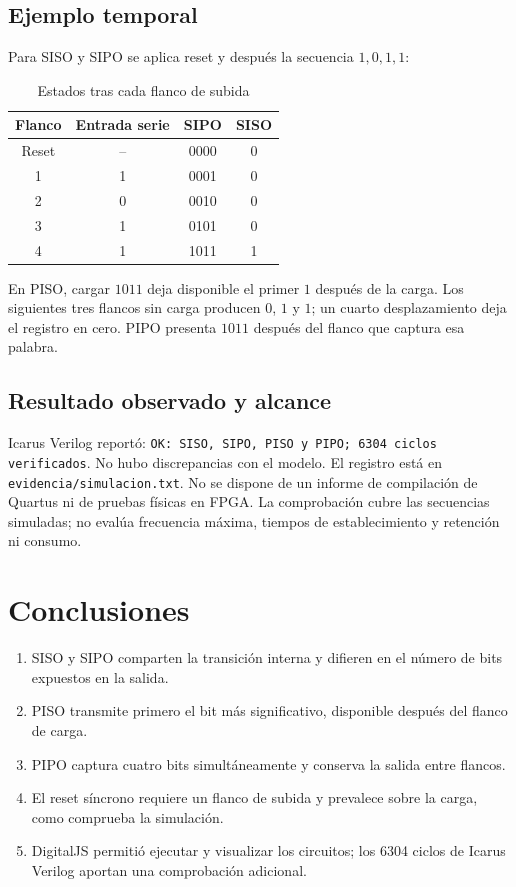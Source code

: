 \documentclass{replab}
\begin{document}
\subsection{Ejemplo temporal}
Para SISO y SIPO se aplica reset y después la secuencia $1,0,1,1$:
\begin{table}[H]
\centering\small
\caption{Estados tras cada flanco de subida}
\begin{tabular}{cccc}
\toprule
Flanco & Entrada serie & SIPO & SISO\\\midrule
Reset & -- & 0000 & 0\\
1 & 1 & 0001 & 0\\
2 & 0 & 0010 & 0\\
3 & 1 & 0101 & 0\\
4 & 1 & 1011 & 1\\\bottomrule
\end{tabular}
\end{table}
En PISO, cargar $1011$ deja disponible el primer $1$ después de la carga. Los siguientes tres flancos sin carga producen $0$, $1$ y $1$; un cuarto desplazamiento deja el registro en cero. PIPO presenta $1011$ después del flanco que captura esa palabra.

\subsection{Resultado observado y alcance}
Icarus Verilog reportó: \texttt{OK: SISO, SIPO, PISO y PIPO; 6304 ciclos verificados}. No hubo discrepancias con el modelo. El registro está en \texttt{evidencia/simulacion.txt}. No se dispone de un informe de compilación de Quartus ni de pruebas físicas en FPGA. La comprobación cubre las secuencias simuladas; no evalúa frecuencia máxima, tiempos de establecimiento y retención ni consumo.

\section{Conclusiones}
\begin{enumerate}[leftmargin=*,itemsep=3pt]
\item SISO y SIPO comparten la transición interna y difieren en el número de bits expuestos en la salida.
\item PISO transmite primero el bit más significativo, disponible después del flanco de carga.
\item PIPO captura cuatro bits simultáneamente y conserva la salida entre flancos.
\item El reset síncrono requiere un flanco de subida y prevalece sobre la carga, como comprueba la simulación.
\item DigitalJS permitió ejecutar y visualizar los circuitos; los 6304 ciclos de Icarus Verilog aportan una comprobación adicional.
\end{enumerate}
\end{document}
